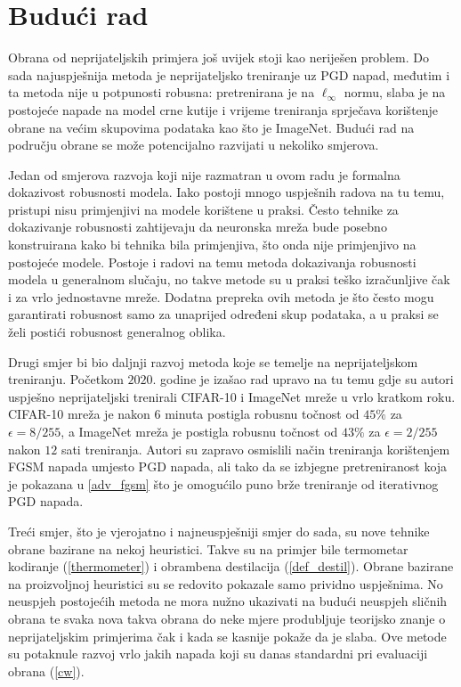 \documentclass[utf8, diplomski]{fer}
\begin{document}
\section{Budući rad}
Obrana od neprijateljskih primjera još uvijek stoji kao neriješen problem. Do sada najuspješnija metoda je neprijateljsko treniranje uz PGD napad, međutim i ta metoda nije u potpunosti robusna: pretrenirana je na $\ell_{\infty}$ normu, slaba je na postojeće napade na model crne kutije i vrijeme treniranja sprječava korištenje obrane na većim skupovima podataka kao što je ImageNet. Budući rad na području obrane se može potencijalno razvijati u nekoliko smjerova. \par
Jedan od smjerova razvoja koji nije razmatran u ovom radu je formalna dokazivost robusnosti modela. Iako postoji mnogo uspješnih radova na tu temu, pristupi nisu primjenjivi na modele korištene u praksi. Često tehnike za dokazivanje robusnosti zahtijevaju da neuronska mreža bude posebno konstruirana kako bi tehnika bila primjenjiva, što onda nije primjenjivo na postojeće modele. Postoje i radovi na temu metoda dokazivanja robusnosti modela u generalnom slučaju, no takve metode su u praksi teško izračunljive čak i za vrlo jednostavne mreže. Dodatna prepreka ovih metoda je što često mogu garantirati robusnost samo za unaprijed određeni skup podataka, a u praksi se želi postići robusnost generalnog oblika. \par
Drugi smjer bi bio daljnji razvoj metoda koje se temelje na neprijateljskom treniranju. Početkom $2020.$ godine je izašao rad upravo na tu temu\citep{fbf} gdje su autori uspješno neprijateljski trenirali CIFAR-10 i ImageNet mreže u vrlo kratkom roku. CIFAR-10 mreža je nakon $6$ minuta postigla robusnu točnost od $45\%$ za $\epsilon = 8 / 255$, a ImageNet mreža je postigla robusnu točnost od $43\%$ za $\epsilon = 2 / 255$ nakon $12$ sati treniranja. Autori su zapravo osmislili način treniranja korištenjem FGSM napada umjesto PGD napada, ali tako da se izbjegne pretreniranost koja je pokazana u \ref{adv_fgsm} što je omogućilo puno brže treniranje od iterativnog PGD napada. \par
Treći smjer, što je vjerojatno i najneuspješniji smjer do sada, su nove tehnike obrane bazirane na nekoj heuristici. Takve su na primjer bile termometar kodiranje (\ref{thermometer}) i obrambena destilacija (\ref{def_destil}). Obrane bazirane na proizvoljnoj heuristici su se redovito pokazale samo prividno uspješnima. No neuspjeh postojećih metoda ne mora nužno ukazivati na budući neuspjeh sličnih obrana te svaka nova takva obrana do neke mjere produbljuje teorijsko znanje o neprijateljskim primjerima čak i kada se kasnije pokaže da je slaba. Ove metode su potaknule razvoj vrlo jakih napada koji su danas standardni pri evaluaciji obrana (\ref{cw}). \par
\end{document}
